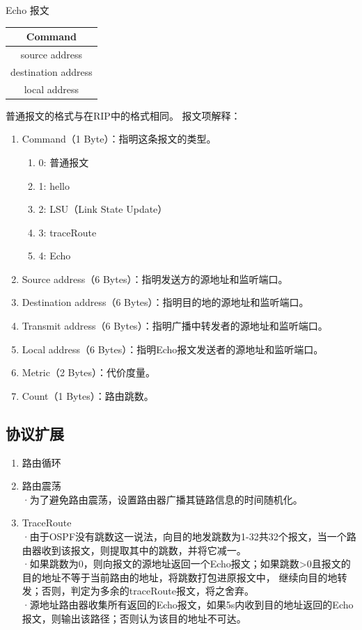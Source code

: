 	Echo 报文
	\begin{table}[H]
	\centering
		\begin{tabular}{|c|}
			\hline
			Command \\
			\hline
			source address \\
			\hline
			destination address \\
			\hline
			local address \\
			\hline
		\end{tabular}		
	\end{table}
	普通报文的格式与在RIP中的格式相同。
	报文项解释：
	\begin{enumerate}[(1)]
	\item Command（1 Byte）：指明这条报文的类型。
	\begin{enumerate}[]
		\item 0: 普通报文
		\item 1: hello
		\item 2: LSU（Link State Update）
		\item 3: traceRoute
		\item 4: Echo
	\end{enumerate}
	\item Source address（6 Bytes）：指明发送方的源地址和监听端口。
	\item Destination address（6 Bytes）：指明目的地的源地址和监听端口。
	\item Transmit address（6 Bytes）：指明广播中转发者的源地址和监听端口。
	\item Local address（6 Bytes）：指明Echo报文发送者的源地址和监听端口。
	\item Metric（2 Bytes）：代价度量。
	\item Count（1 Bytes）：路由跳数。
	\end{enumerate}
	
	\subsection{协议扩展} %
	\label{sub:协议扩展}
		\begin{enumerate}
			\item 路由循环
			\item 路由震荡\\
				·为了避免路由震荡，设置路由器广播其链路信息的时间随机化。
			\item TraceRoute\\
				·由于OSPF没有跳数这一说法，向目的地发跳数为1-32共32个报文，当一个路由器收到该报文，则提取其中的跳数，并将它减一。\\
				·如果跳数为0，则向报文的源地址返回一个Echo报文；如果跳数>0且报文的目的地址不等于当前路由的地址，将跳数打包进原报文中，
				继续向目的地转发；否则，判定为多余的traceRoute报文，将之舍弃。\\
				·源地址路由器收集所有返回的Echo报文，如果5s内收到目的地址返回的Echo报文，则输出该路径；否则认为该目的地址不可达。
		\end{enumerate}
